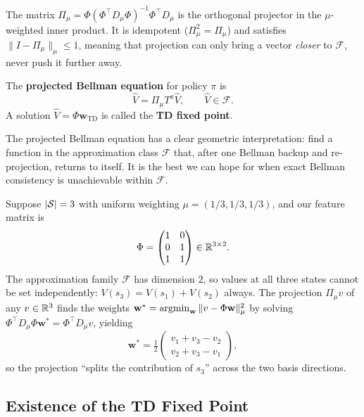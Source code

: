 The matrix $\Pi_\mu = \Phi(\Phi^\top D_\mu \Phi)^{-1}\Phi^\top D_\mu$ is the orthogonal
projector in the $\mu$-weighted inner product.  It is idempotent ($\Pi_\mu^2 = \Pi_\mu$) and
satisfies $\|I - \Pi_\mu\|_\mu \leq 1$, meaning that projection can only bring a vector
\emph{closer} to $\mathcal{F}$, never push it further away.

\begin{definition}
\label{def:projected-bellman}
The \textbf{projected Bellman equation} for policy $\pi$ is
\begin{equation}
\label{eq:projected-bellman}
\hat{V} = \Pi_\mu T^\pi \hat{V}, \qquad \hat{V} \in \mathcal{F}.
\end{equation}
A solution $\hat{V} = \Phi \mathbf{w}_{\mathrm{TD}}$ is called the
\textbf{TD fixed point}.
\end{definition}

The projected Bellman equation has a clear geometric interpretation: find a function in the
approximation class $\mathcal{F}$ that, after one Bellman backup and re-projection, returns to
itself.  It is the best we can hope for when exact Bellman consistency is unachievable within
$\mathcal{F}$.

\begin{example}
\label{ex:three-state-projection}
Suppose $|\mathcal{S}| = 3$ with uniform weighting $\mu = (1/3, 1/3, 1/3)$, and our feature matrix is
\[
\Phi = \begin{pmatrix} 1 & 0 \\ 0 & 1 \\ 1 & 1 \end{pmatrix} \in \mathbb{R}^{3 \times 2}.
\]
The approximation family $\mathcal{F}$ has dimension $2$, so values at all three states cannot be
set independently: $V(s_3) = V(s_1) + V(s_2)$ always.  The projection $\Pi_\mu v$ of any
$v \in \mathbb{R}^3$ finds the weights $\mathbf{w}^* = \operatorname*{argmin}_\mathbf{w} \|v - \Phi \mathbf{w}\|_\mu^2$
by solving $\Phi^\top D_\mu \Phi \mathbf{w}^* = \Phi^\top D_\mu v$, yielding
\[
\mathbf{w}^* = \tfrac{1}{2}\begin{pmatrix} v_1 + v_3 - v_2 \\ v_2 + v_3 - v_1 \end{pmatrix},
\]
so the projection ``splits the contribution of $s_3$'' across the two basis directions.
\end{example}

\subsection{Existence of the TD Fixed Point}

